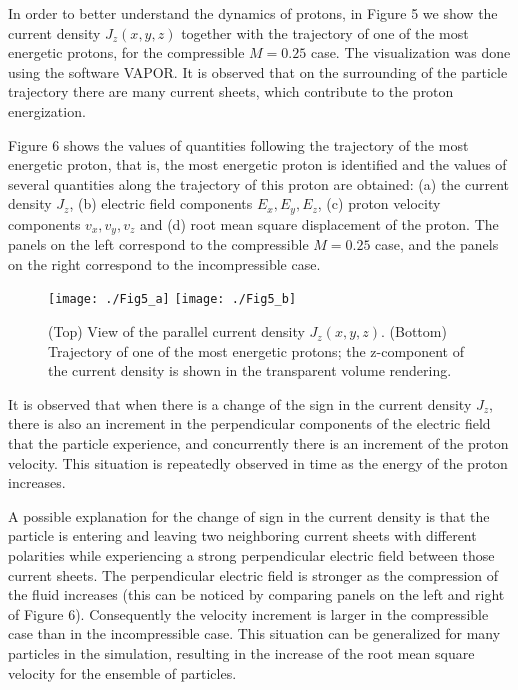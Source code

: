\documentclass[%
aip,pop,amsmath,amssymb,
 reprint,%
]{revtex4-1}
\begin{document}
In order to better understand the dynamics of protons, in Figure
5 we show the current density $J_z(x,y,z)$ together
with the trajectory of one of the most energetic protons,
for the compressible $M=0.25$ case. The visualization was done using the software
VAPOR\cite{vapor}. It is observed that on the surrounding of the particle trajectory 
there are many current sheets, which contribute to the proton energization.

Figure 6 shows the values of quantities following the trajectory of the
most energetic proton, that is, the most energetic proton is identified
and the values of several quantities along the trajectory of this proton
are obtained: (a) the current density $J_z$, (b) electric field 
components $E_x, E_y, E_z$, (c) proton velocity components $v_x, v_y, v_z$ and (d) root
mean square displacement of the proton. The panels on the left correspond to the
compressible $M=0.25$ case, and the panels on the right correspond to the incompressible case.


\begin{figure}[h!]
\begin{center}
{\texttt{[image: ./Fig5\_a]}}
{\texttt{[image: ./Fig5\_b]}}
\caption{(Top) View of the parallel current density $J_z(x,y,z)$.
(Bottom) Trajectory of one of the most energetic protons; the z-component of the current 
density is shown in the transparent volume rendering.}
\end{center}
\label{mean square velocity}
\end{figure}
It is observed that when there is a change of the sign in the 
current density $J_z$, there is also an increment in the 
perpendicular components of the electric field that 
the particle experience, and concurrently there is an increment 
of the proton velocity. This situation
is repeatedly observed in time as the energy of the proton increases.

A possible explanation for the change of sign in the current density is 
that the particle is entering and leaving two neighboring 
current sheets with different polarities while experiencing
a strong perpendicular electric field between those current sheets. 
The perpendicular electric field
is stronger as the compression of the fluid increases (this can be noticed
by comparing panels on the left and right of Figure 6).
Consequently the velocity increment is larger in the compressible case 
than in the incompressible case.
This situation can be 
generalized for many particles in the simulation, 
resulting in the increase of the root mean 
square velocity for the ensemble of particles. 
\end{document}
